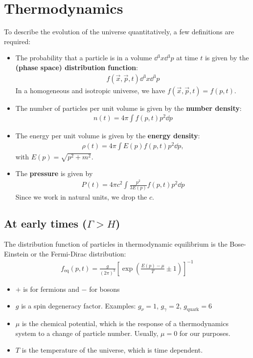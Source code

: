 \section{Thermodynamics}

To describe the evolution of the universe quantitatively, a few definitions are required:

\begin{itemize}
	\item The probability that a particle is in a volume $\dd{^3 x} \dd{^3 p}$  at time $t$ is given by the \textbf{(phase space) distribution function}:
	\begin{align*}
		f(\vec{x}, \vec{p}, t) \dd{^3 x} \dd{^3 p}
	\end{align*}
	In a homogeneous and isotropic universe, we have $f(\vec{x}, \vec{p}, t) = f(p, t)$.
	\item The number of particles per unit volume is given by the \textbf{number density}:
	\begin{align*}
		n(t) = 4\pi \int f(p,t) p^2  \dd{p}
	\end{align*}
	\item The energy per unit volume is given by the \textbf{energy density}:
	\begin{align*}
		\rho(t) = 4 \pi \int E(p) f(p,t) p^2 \dd{p},
	\end{align*}
	with $E(p) = \sqrt{p^2 + m^2}$.
	\item The \textbf{pressure} is given by
	\begin{align*}
		P(t) = 4 \pi c^2 \int \frac{p^2}{3 E(p)} f(p,t) p^2 \dd{p}
	\end{align*}
	Since we work in natural units, we drop the $c$.
\end{itemize}


\subsection{At early times ($\Gamma > H$)}
\label{ssec:early-times}
The distribution function of particles in thermodynamic equilibrium is the Bose-Einstein or the Fermi-Dirac distribution:
\begin{align*}
	f_\text{eq}(p,t)
	= \frac{g}{(2\pi)^3} \left[ \exp\left( 
		\frac{E(p)-\mu}{T} \pm 1
	 \right) \right]^{-1}
\end{align*}
\begin{itemize}
	\item $+$ is for fermions and $-$ for bosons
	\item $g$ is a spin degeneracy factor. Examples: $g_\nu = 1$, $g_\gamma = 2$, $g_\text{quark} = 6$
	\item $\mu$ is the chemical potential, which is the response of a thermodynamics system to a change of particle number. Usually, $\mu=0$ for our purposes.
	\item $T$ is the temperature of the universe, which is time dependent.
\end{itemize}


